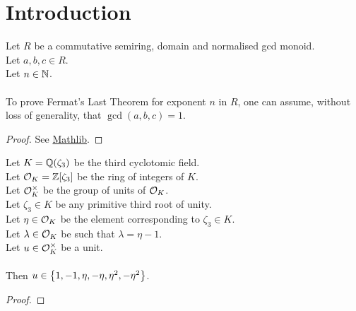 \chapter{Introduction}


\begin{lemma}
    \label{lmm:fermatLastTheoremWith_of_fermatLastTheoremWith_coprime}
    \leanok
    Let $R$ be a commutative semiring, domain and normalised gcd monoid.\\%
    Let $a, b, c \in R$. \\
    Let $n \in \mathbb{N}$. \\\\
    To prove Fermat's Last Theorem for exponent $n$ in $R$,
    one can assume, without loss of generality, that $\gcd(a,b,c)=1$.
\end{lemma}
\begin{proof}
    \leanok
    See \href{https://pitmonticone.github.io/FLT3/docs/FLT3/Mathlib/NumberTheory/FLT/Basic.html#fermatLastTheoremWith_of_fermatLastTheoremWith_coprime}{Mathlib}.
\end{proof}

\begin{theorem}
    \label{thm:mem}
    \leanok
    Let $K = \mathbb{Q}(\zeta_3)$ be the third cyclotomic field. \\
    Let $\mathcal{O}_K = \mathbb{Z}[\zeta_3]$ be the ring of integers of $K$. \\
    Let $\mathcal{O}^\times_K$ be the group of units of $\mathcal{O}_K$. \\
    Let $\zeta_3 \in K$ be any primitive third root of unity. \\
    Let $\eta \in \mathcal{O}_K$ be the element corresponding to $\zeta_3 \in K$. \\
    Let $\lambda \in \mathcal{O}_K$ be such that $\lambda = \eta -1$. \\
    Let $u \in \mathcal{O}^\times_K$ be a unit. \\\\
    Then $u \in \left\{1, -1, \eta, -\eta, \eta^2, -\eta^2\right\}$.
\end{theorem}
\begin{proof}
    \leanok
\end{proof}

